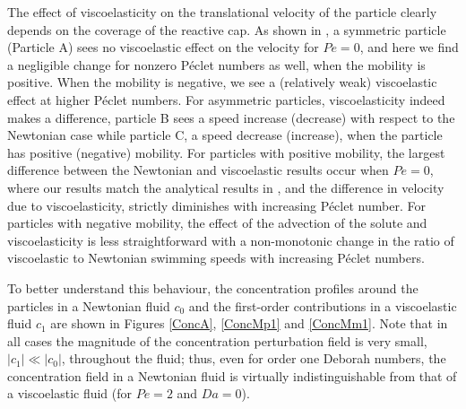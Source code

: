 \documentclass[aps,pre,reprint,twocolumn,notitlepage,superscriptaddress]{revtex4-1}
\begin{document}
The effect of viscoelasticity on the translational velocity of the particle clearly depends on the coverage of the reactive cap. As shown in \citet{datt2017active}, a symmetric particle (Particle A) sees no viscoelastic effect on the velocity for $Pe=0$, and here we find a negligible change for nonzero P\'eclet numbers as well, when the mobility is positive. When the mobility is negative, we see a (relatively weak) viscoelastic effect at higher P\'eclet numbers. For asymmetric particles, viscoelasticity indeed makes a difference, particle B sees a speed increase (decrease) with respect to the Newtonian case while particle C, a speed decrease (increase), when the particle has positive (negative) mobility. For particles with positive mobility, the largest difference between the Newtonian and viscoelastic results occur when $Pe=0$, where our results match the analytical results in \citet{datt2017active}, and the difference in velocity due to viscoelasticity, strictly diminishes with increasing P\'eclet number. For particles with negative mobility, the effect of the advection of the solute and viscoelasticity is less straightforward with a non-monotonic change in the ratio of viscoelastic to Newtonian swimming speeds with increasing P\'eclet numbers.

To better understand this behaviour, the concentration profiles around the particles in a Newtonian fluid $c_0$ and the first-order contributions in a viscoelastic fluid $c_1$ are shown in Figures \ref{ConcA}, \ref{ConcMp1} and \ref{ConcMm1}. Note that in all cases the magnitude of the concentration perturbation field is very small, $\left|c_1\right|\ll \left|c_0\right|$, throughout the fluid; thus, even for order one Deborah numbers, the concentration field in a Newtonian fluid is virtually indistinguishable from that of a viscoelastic fluid (for $Pe=2$ and $Da=0$).
\end{document}
